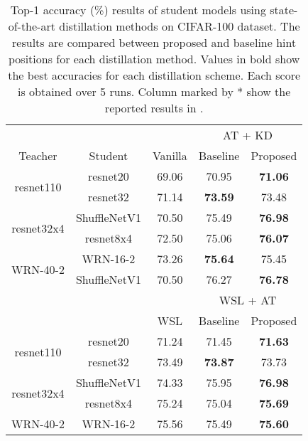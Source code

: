 \documentclass[final,3p,times]{elsarticle}
\begin{document}
\begin{table}[]
\begin{center}

\caption{
Top-1 accuracy (\%) results of student models using state-of-the-art distillation methods on CIFAR-100 dataset. The results are compared between proposed and baseline hint positions for each distillation method. Values in bold show the best accuracies for each distillation scheme. Each score is obtained over 5 runs. Column marked by * show the reported results in \citep{shao2021multi}.
\\}

\begin{tabular}{c|c|c|c|c}
 &  &    & \multicolumn{2}{c}{AT + KD}               \\ \cline{4-5}
 Teacher &   Student &  Vanilla & Baseline  & Proposed    \\    \hline \hline    
\multirow{2}{*}{resnet110}  & resnet20   & 69.06    & 70.95 & \textbf{71.06}     \\
 & resnet32 & 71.14  & \textbf{73.59}     & 73.48              \\ \hline
\multirow{2}{*}{resnet32x4} & ShuffleNetV1 & 70.50   & 75.49 & \textbf{76.98}     \\
  & resnet8x4   & 72.50  & 75.06     & \textbf{76.07}     \\ \hline
\multirow{2}{*}{WRN-40-2}   & WRN-16-2   & 73.26       & \textbf{75.64}     & 75.45         \\
   & ShuffleNetV1  & 70.50    & 76.27              & \textbf{76.78}     \\ \hline \hline 
\multicolumn{1}{l}{}        & \multicolumn{1}{l}{} & &\multicolumn{2}{c}{WSL + AT}    \\ \cline{4-5}
\multicolumn{1}{l}{}        & \multicolumn{1}{l}{} & {WSL}    & Baseline & Proposed \\ \hline
\multirow{2}{*}{resnet110}        & resnet20             & {71.24} & 71.45              & \textbf{71.63}     \\
 & resnet32  & {73.49} & \textbf{73.87}     & 73.73 \\ \hline
\multirow{2}{*}{resnet32x4} & ShuffleNetV1         & {74.33} & 75.95              & \textbf{76.98}     \\
                            & resnet8x4            & {75.24} & 75.04              & \textbf{75.69}     \\ \hline
\multirow{2}{*}{WRN-40-2}   & WRN-16-2             & {75.56} & 75.49              & \textbf{75.60}     \\

\end{tabular}
\end{center}
\end{table}
\end{document}
